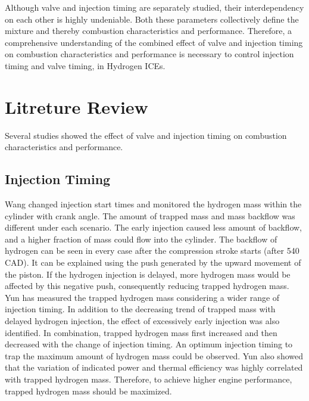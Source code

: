 \documentclass[conference]{IEEEtran}
\begin{document}
Although valve and injection timing are separately studied, their interdependency on each other is highly undeniable.
Both these parameters collectively define the mixture and thereby combustion characteristics and performance.
Therefore, a comprehensive understanding of the combined effect of valve and injection timing on combustion characteristics and performance is necessary to control injection timing and valve timing, in Hydrogen ICEs.\\

\section{Litreture Review}

Several studies showed the effect of valve and injection timing on combustion characteristics and performance.

\subsection{Injection Timing}

Wang \cite{b1} changed injection start times and monitored the hydrogen mass within the cylinder with crank angle.
The amount of trapped mass and mass backflow was different under each scenario.
The early injection caused less amount of backflow, and a higher fraction of mass could flow into the cylinder.
The backflow of hydrogen can be seen in every case after the compression stroke starts (after 540 CAD).
It can be explained using the push generated by the upward movement of the piston.
If the hydrogen injection is delayed, more hydrogen mass would be affected by this negative push, consequently reducing trapped hydrogen mass.
Yun \cite{b2} has measured the trapped hydrogen mass considering a wider range of injection timing.
In addition to the decreasing trend of trapped mass with delayed hydrogen injection, the effect of excessively early injection was also identified.
In combination, trapped hydrogen mass first increased and then decreased with the change of injection timing.
An optimum injection timing to trap the maximum amount of hydrogen mass could be observed.
Yun \cite{b2} also showed that the variation of indicated power and thermal efficiency was highly correlated with trapped hydrogen mass.
Therefore, to achieve higher engine performance, trapped hydrogen mass should be maximized.\\
\end{document}
